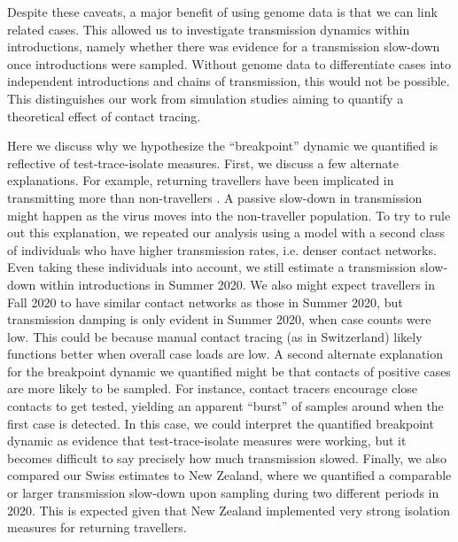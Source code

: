\documentclass[9pt,twoside,lineno]{pnas-new} %
\begin{document}
Despite these caveats, a major benefit of using genome data is that we can link related cases. This allowed us to investigate transmission dynamics within introductions, namely whether there was evidence for a transmission slow-down once introductions were sampled. Without genome data to differentiate cases into independent introductions and chains of transmission, this would not be possible. This distinguishes our work from simulation studies aiming to quantify a theoretical effect of contact tracing. 

Here we discuss why we hypothesize the ``breakpoint'' dynamic we quantified is reflective of test-trace-isolate measures. First, we discuss a few alternate explanations. For example, returning travellers have been implicated in transmitting more than non-travellers \cite{Hodcroft2021}. A passive slow-down in transmission might happen as the virus moves into the non-traveller population. To try to rule out this explanation, we repeated our analysis using a model with a second class of individuals who have higher transmission rates, i.e. denser contact networks. Even taking these individuals into account, we still estimate a transmission slow-down within introductions in Summer 2020. We also might expect travellers in Fall 2020 to have similar contact networks as those in Summer 2020, but transmission damping is only evident in Summer 2020, when case counts were low. This could be because manual contact tracing (as in Switzerland) likely functions better when overall case loads are low. A second alternate explanation for the breakpoint dynamic we quantified might be that contacts of positive cases are more likely to be sampled. For instance, contact tracers encourage close contacts to get tested, yielding an apparent ``burst'' of samples around when the first case is detected. In this case, we could interpret the quantified breakpoint dynamic as evidence that test-trace-isolate measures were working, but it becomes difficult to say precisely how much transmission slowed. Finally, we also compared our Swiss estimates to New Zealand, where we quantified a comparable or larger transmission slow-down upon sampling during two different periods in 2020. This is expected given that New Zealand implemented very strong isolation measures for returning travellers.
\end{document}

